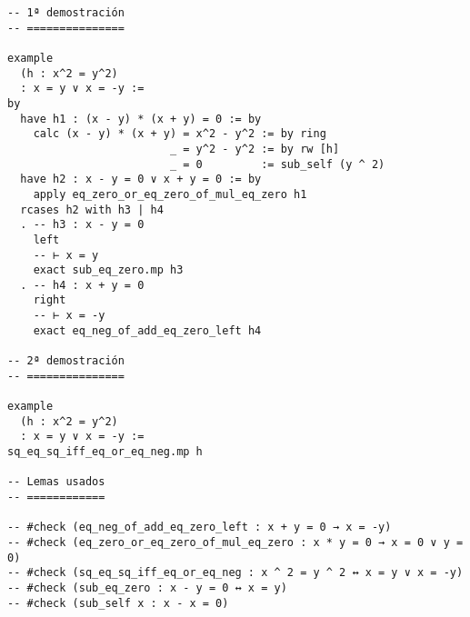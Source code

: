 \begin{verbatim}
-- 1ª demostración
-- ===============

example
  (h : x^2 = y^2)
  : x = y ∨ x = -y :=
by
  have h1 : (x - y) * (x + y) = 0 := by
    calc (x - y) * (x + y) = x^2 - y^2 := by ring
                         _ = y^2 - y^2 := by rw [h]
                         _ = 0         := sub_self (y ^ 2)
  have h2 : x - y = 0 ∨ x + y = 0 := by
    apply eq_zero_or_eq_zero_of_mul_eq_zero h1
  rcases h2 with h3 | h4
  . -- h3 : x - y = 0
    left
    -- ⊢ x = y
    exact sub_eq_zero.mp h3
  . -- h4 : x + y = 0
    right
    -- ⊢ x = -y
    exact eq_neg_of_add_eq_zero_left h4

-- 2ª demostración
-- ===============

example
  (h : x^2 = y^2)
  : x = y ∨ x = -y :=
sq_eq_sq_iff_eq_or_eq_neg.mp h

-- Lemas usados
-- ============

-- #check (eq_neg_of_add_eq_zero_left : x + y = 0 → x = -y)
-- #check (eq_zero_or_eq_zero_of_mul_eq_zero : x * y = 0 → x = 0 ∨ y = 0)
-- #check (sq_eq_sq_iff_eq_or_eq_neg : x ^ 2 = y ^ 2 ↔ x = y ∨ x = -y)
-- #check (sub_eq_zero : x - y = 0 ↔ x = y)
-- #check (sub_self x : x - x = 0)
\end{verbatim}

